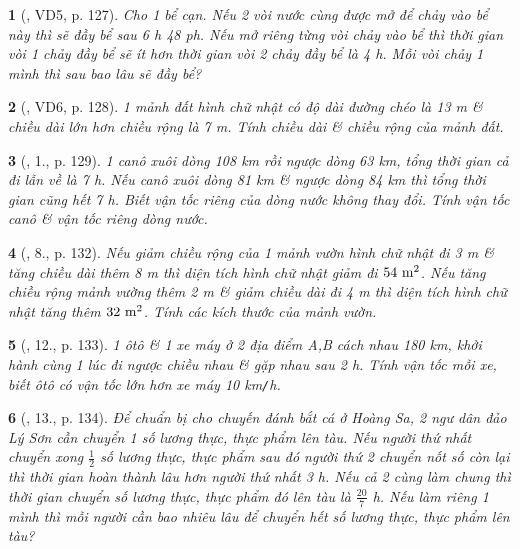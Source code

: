 \documentclass{article}
\newtheorem{baitoan}{}
\begin{document}
\begin{baitoan}[\cite{Kien_dai_so_9}, VD5, p. 127]
	Cho 1 bể cạn. Nếu 2 vòi nước cùng được mở để chảy vào bể này thì sẽ đầy bể sau {\rm6 h 48 ph}. Nếu mở riêng từng vòi chảy vào bể thì thời gian vòi 1 chảy đầy bể sẽ ít hơn thời gian vòi 2 chảy đầy bể là {\rm4 h}. Mỗi vòi chảy 1 mình thì sau bao lâu sẽ đầy bể?
\end{baitoan}

\begin{baitoan}[\cite{Kien_dai_so_9}, VD6, p. 128]
	1 mảnh đất hình chữ nhật có độ dài đường chéo là {\rm13 m} \& chiều dài lớn hơn chiều rộng là {\rm7 m}. Tính chiều dài \& chiều rộng của mảnh đất.
\end{baitoan}

\begin{baitoan}[\cite{Kien_dai_so_9}, 1., p. 129]
	1 canô xuôi dòng {\rm108 km} rồi ngược dòng {\rm63 km}, tổng thời gian cả đi lẫn về là {\rm7 h}. Nếu canô xuôi dòng {\rm81 km} \& ngược dòng {\rm84 km} thì tổng thời gian cũng hết {\rm7 h}. Biết vận tốc riêng của dòng nước không thay đổi. Tính vận tốc canô \& vận tốc riêng dòng nước.
\end{baitoan}

\begin{baitoan}[\cite{Kien_dai_so_9}, 8., p. 132]
	Nếu giảm chiều rộng của 1 mảnh vườn hình chữ nhật đi {\rm3 m} \& tăng chiều dài thêm {\rm8 m} thì diện tích hình chữ nhật giảm đi $\rm54\ m^2$. Nếu tăng chiều rộng mảnh vường thêm {\rm2 m} \& giảm chiều dài đi {\rm4 m} thì diện tích hình chữ nhật tăng thêm $\rm32\ m^2$. Tính các kích thước của mảnh vườn.
\end{baitoan}

\begin{baitoan}[\cite{Kien_dai_so_9}, 12., p. 133]
	1 ôtô \& 1 xe máy ở 2 địa điểm A,B cách nhau {\rm180 km}, khởi hành cùng 1 lúc đi ngược chiều nhau \& gặp nhau sau {\rm2 h}. Tính vận tốc mỗi xe, biết ôtô có vận tốc lớn hơn xe máy {\rm10 km{\tt/}h}.
\end{baitoan}

\begin{baitoan}[\cite{Kien_dai_so_9}, 13., p. 134]
	Để chuẩn bị cho chuyến đánh bắt cá ở Hoàng Sa, 2 ngư dân đảo Lý Sơn cần chuyển 1 số lương thực, thực phẩm lên tàu. Nếu người thứ nhất chuyển xong $\frac{1}{2}$ số lương thực, thực phẩm sau đó người thứ 2 chuyển nốt số còn lại thì thời gian hoàn thành lâu hơn người thứ nhất {\rm3 h}. Nếu cả 2 cùng làm chung thì thời gian chuyển số lương thực, thực phẩm đó lên tàu là $\frac{20}{7}$ {\rm h}. Nếu làm riêng 1 mình thì mỗi người cần bao nhiêu lâu để chuyển hết số lương thực, thực phẩm lên tàu?
\end{baitoan}
\end{document}

